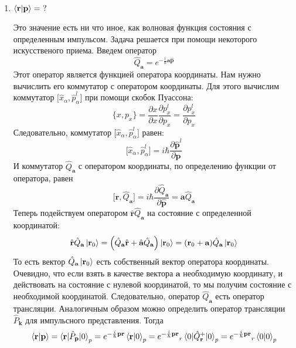 \documentclass{article}
\begin{document}
\begin{enumerate}
	\item $\braket{\textbf{r}|\textbf{p}} = \ ?$
	
	Это значение есть ни что иное, как волновая функция состояния с определенным импульсом. Задача решается при помощи некоторого искусственого приема. Введем оператор
	\begin{equation}
		\hat{Q}_{\textbf{a}} = e^{-\frac{i}{\hbar}\textbf{a}\hat{\textbf{p}}}
	\end{equation}
	Этот оператор является функцией оператора координаты. Нам нужно вычислить его коммутатор с оператором координаты. Для этого вычислим коммутатор $\big[\hat{x}_\alpha,\hat{p}_\alpha^l \big]$ при помощи скобок Пуассона:
	\begin{equation}
		\Big\{x, p_x \Big\} = \frac{\partial x}{\partial x} \frac{\partial p_x^l}{\partial p_x} = \frac{\partial p_x^l}{\partial p_x}
	\end{equation}
	Следовательно, коммутатор $\big[\hat{x}_\alpha,\hat{p}_\alpha^l \big]$ равен:
	\begin{equation}
		\big[\hat{x}_\alpha,\hat{p}_\alpha^l \big] = i\hbar \frac{\partial \hat{\textbf{p}}^l}{\partial \hat{\textbf{p}}}
	\end{equation}
	И коммутатор $\hat{Q}_\textbf{a}$ с оператором координаты, по определению функции от оператора, равен
	\begin{equation}
		\Big[\hat{\textbf{r}},\hat{Q}_\textbf{a} \Big] = i\hbar \frac{\partial \hat{Q}_\textbf{a}}{\partial \hat{\textbf{p}}} = \textbf{a}\hat{Q}_\textbf{a}
	\end{equation}
	Теперь подействуем оператором $\hat{\textbf{r}}\hat{Q}_\textbf{a}$ на состояние с определенной координатой:
	\begin{equation}
		\hat{\textbf{r}}\hat{Q}_\textbf{a} \ket{\textbf{r}_0} = \Big(\hat{Q}_\textbf{a}\hat{\textbf{r}} + \hat{\textbf{a}}\hat{Q}_\textbf{a}\Big)\ket{\textbf{r}_0} = (\textbf{r}_0 + \textbf{a})\hat{Q}_\textbf{a} \ket{\textbf{r}_0}
	\end{equation}
	То есть вектор $\hat{Q}_\textbf{a} \ket{\textbf{r}_0}$ есть собственный вектор оператора координаты. Очевидно, что если взять в качестве вектора $\textbf{a}$ необходимую координату, и действовать на состояние с нулевой координатой, то мы получим состояние с необходимой координатой. Следовательно, оператор $\hat{Q}_\textbf{a}$ есть оператор трансляции. Аналогичным образом можно определить оператор трансляции $\hat{P}_\textbf{k}$ для импульсного представления. Тогда
	\begin{equation}
		\braket{\textbf{r}|\textbf{p}} = \braket{\textbf{r}|\hat{P}_\textbf{p}|0}_p = e^{-\frac{i}{\hbar}\textbf{pr}} \braket{\textbf{r}|0}_p = {e^{-\frac{i}{\hbar}\textbf{pr}}}_r \braket{0|\hat{Q}_\textbf{r}^+|0}_p = {e^{-\frac{i}{\hbar}\textbf{pr}}}_r \braket{0|0}_p \label{rp}

\end{equation}
\end{enumerate}
\end{document}
